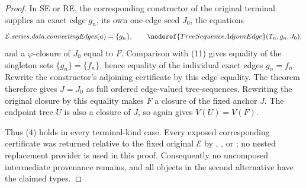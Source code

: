 \begin{proof}
In SE or RE, the corresponding constructor of the original terminal
 supplies an exact edge \(g_n\), its own
one-edge seed \(J_0\), the equations
\[
 \mathcal E.\mathit{series.data.connectingEdges}(a)=\{g_n\},
 \qquad \noderef{TreeSequenceAdjoinEdge}(T_n,g_n,J_0),
\]
and a \(\varphi\)-closure of \(J_0\) equal to \(F\).  Comparison with
(11) gives equality of the singleton sets \(\{g_n\}=\{f_n\}\), hence
equality of the individual exact edges \(g_n=f_n\).  Rewrite the
constructor's adjoining certificate by this edge equality.  The theorem
 therefore gives \(J=J_0\) as full
ordered edge-valued tree-sequences.  Rewriting the original closure by this
equality makes \(F\) a closure of the fixed anchor \(J\).  The endpoint
tree \(U\) is also a closure of \(J\), so
 again gives \(V(U)=V(F)\).

Thus (4) holds in every terminal-kind case.  Every exposed corresponding
certificate was returned relative to the fixed original \(\mathcal E\) by
,
, or
; no nested replacement provider
is used in this proof.  Consequently no uncomposed intermediate provenance
remains, and all objects in the second alternative have the claimed types.
\end{proof}
